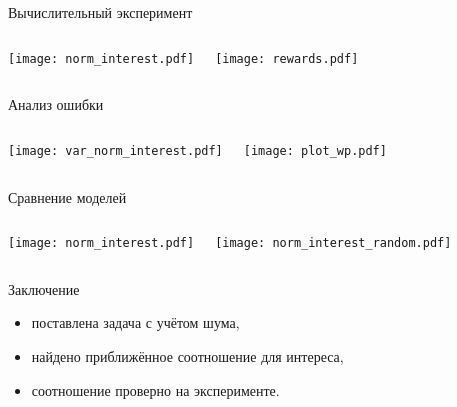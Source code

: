 \documentclass{beamer}
\begin{document}
\begin{frame}{Вычислительный эксперимент}

\begin{columns}[c]
\begin{center}
  \texttt{[image: norm\_interest.pdf]}
\end{center}
\begin{center}
  \texttt{[image: rewards.pdf]}
\end{center}
\end{columns}

\end{frame}
\begin{frame}{Анализ ошибки}

\begin{columns}[c]
\begin{center}
  \texttt{[image: var\_norm\_interest.pdf]}
\end{center}
\begin{center}
  \texttt{[image: plot\_wp.pdf]}
\end{center}
\end{columns}

\end{frame}
\begin{frame}{Сравнение моделей}

\begin{columns}[c]
\begin{center}
  \texttt{[image: norm\_interest.pdf]}
\end{center}
\begin{center}
  \texttt{[image: norm\_interest\_random.pdf]}
\end{center}
\end{columns}
\end{frame}
\begin{frame}{Заключение}
  \begin{itemize}
      \item поставлена задача с учётом шума,
      \item найдено приближённое соотношение для интереса,
      \item соотношение проверно на эксперименте.
  \end{itemize}
\end{frame}
\end{document}
